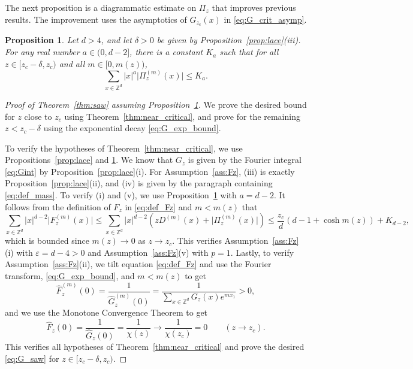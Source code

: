 \documentclass[11pt,hidelinks]{article}
\theoremstyle{plain}
\newtheorem{proposition}[theorem]{Proposition}
\numberwithin{equation}{section}
\newcommand{\eps}{\varepsilon}
\newcommand{\Z}{\mathbb{Z}}
\renewcommand{\(}{\left(}
\renewcommand{\)}{\right)}
\newcommand{\1}{\mathds{1}}
\providecommand{\abs}[1]{\lvert#1\rvert}
\newcommand{\mz}{m(z)}
\newcommand{\supm}{^{(m)}}
\newcommand{\crit}{_{z_c}}
\begin{document}
The next proposition is a diagrammatic estimate on $\Pi_z$ that improves previous results. 
The improvement uses the asymptotics of $G\crit(x)$ in \eqref{eq:G_crit_asymp}. 

\begin{proposition}
\label{prop:diagram}
Let $d>4$, and let $\delta > 0$ be given by Proposition~\ref{prop:lace}(iii).
For any real number $a \in (0,d-2]$,
there is a constant $K_a$ such that
for all $z \in [z_c - \delta, z_c)$
and all $m \in [0, \mz)$, 
\begin{equation} \label{eq:Pi_moments}
\sum_{x\in \Z^d} \abs x^a \abs{ \Pi_z \supm(x) } \le K_a .
\end{equation}
\end{proposition}

\begin{proof}[Proof of Theorem~\ref{thm:saw} assuming Proposition~\ref{prop:diagram}]
We prove the desired bound for $z$ close to $z_c$ using Theorem~\ref{thm:near_critical}, 
and prove for the remaining $z < z_c - \delta$ using the exponential decay \eqref{eq:G_exp_bound}. 

To verify the hypotheses of Theorem~\ref{thm:near_critical},
we use Propositions~\ref{prop:lace} and \ref{prop:diagram}.
We know that $G_z$ is given by the Fourier integral \eqref{eq:Gint} by Proposition~\ref{prop:lace}(i). 
For Assumption~\ref{ass:Fz}, (iii) is exactly Proposition~\ref{prop:lace}(ii), and (iv) is given by the paragraph containing \eqref{eq:def_mass}. 
To verify (i) and (v), we use Proposition~\ref{prop:diagram} with $a=d-2$.
It follows from the definition of  $F_z$ in \eqref{eq:def_Fz} and $m < \mz$ that
\begin{equation}
\sum_{x\in \Z^d} \abs x^{d-2} \abs{ F_z\supm(x) } 
\le \sum_{x\in \Z^d} \abs x^{d-2} \( z  D\supm(x)   + \abs{ \Pi_z\supm(x) } \)
\le \frac{ z_c }d ( d-1 + \cosh \mz) + K_{d-2}, 
\end{equation}
which is bounded since $\mz \to 0$ as $z\to z_c$. 
This verifies Assumption~\ref{ass:Fz}(i) with $\eps = d - 4 > 0$ and Assumption~\ref{ass:Fz}(v) with $p=1$. 
Lastly, to verify Assumption~\ref{ass:Fz}(ii), we tilt equation \eqref{eq:def_Fz} and use the Fourier transform, \eqref{eq:G_exp_bound}, and $m < \mz$
to get
\begin{equation}
\hat F_z\supm(0) = \frac 1 { \hat G_z \supm (0) } 
= \frac 1 { \sum_{x\in \Z^d} G_z(x) e^{mx_1} } >0, 
\end{equation}
and we use the Monotone Convergence Theorem to get
\begin{equation}
\hat F_z(0) = \frac 1 { \hat G_z  (0) }  
= \frac 1 { \chi(z) } \to  \frac 1 { \chi(z_c) } = 0
	\qquad (z\to z_c).
\end{equation}
This verifies all hypotheses of Theorem~\ref{thm:near_critical} and prove the desired \eqref{eq:G_saw} for $z \in [z_c - \delta, z_c)$. 



\end{proof}
\end{document}
